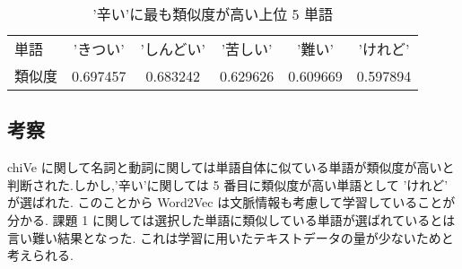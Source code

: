 \documentclass{jarticle}     %
\begin{document}
\begin{table}[H]
  \caption{'辛い'に最も類似度が高い上位 5 単語}
  \label{辛い}
  \centering
  \begin{tabular}{lccccc}
    \hline
    単語       & 'きつい'  & 'しんどい'     & '苦しい'     & '難い'   & 'けれど'     \\
    類似度 & 0.697457 & 0.683242 & 0.629626 & 0.609669 & 0.597894 \\
    \hline
  \end{tabular}
\end{table}

\subsection{考察}
chiVe に関して名詞と動詞に関しては単語自体に似ている単語が類似度が高いと判断された.しかし,'辛い'に関しては 5 番目に類似度が高い単語として 'けれど' が選ばれた. このことから Word2Vec は文脈情報も考慮して学習していることが分かる.
課題 1 に関しては選択した単語に類似している単語が選ばれているとは言い難い結果となった. これは学習に用いたテキストデータの量が少ないためと考えられる.




\end{document}
